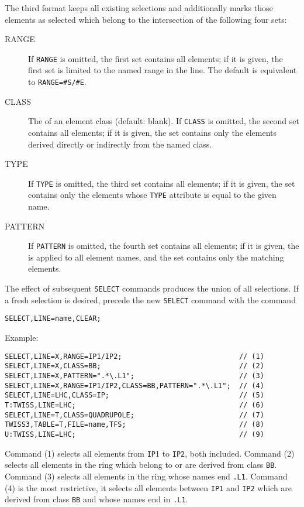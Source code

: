 The third format keeps all existing selections and additionally marks those
elements as selected which belong to the intersection of the following four
sets: 
\begin{description}
\item[RANGE]
  If \texttt{RANGE} is omitted, the first set contains all elements;
  if it is given, the first set is limited to the named range in the line. 
  The default is equivalent to \texttt{RANGE=\#S/\#E}.
\item[CLASS]
  The  of an element class (default: blank).
  If \texttt{CLASS} is omitted, the second set contains all elements;
  if it is given, the set contains only the elements derived directly or
  indirectly from the named class.
\item[TYPE]
  If \texttt{TYPE} is omitted, the third set contains all elements;
  if it is given, the set contains only the elements whose \texttt{TYPE}
  attribute is equal to the given name. 
\item[PATTERN]
  If \texttt{PATTERN} is omitted, the fourth set contains all elements;
  if it is given, the 
  is applied to all element names, and the set contains only the matching
  elements.
\end{description}
The effect of subsequent \texttt{SELECT} commands produces the union of all
selections. 
If a fresh selection is desired, precede the new \texttt{SELECT} command
with the command
\begin{verbatim}
SELECT,LINE=name,CLEAR;
\end{verbatim}
Example:
\begin{verbatim}
SELECT,LINE=X,RANGE=IP1/IP2;                            // (1)
SELECT,LINE=X,CLASS=BB;                                 // (2)
SELECT,LINE=X,PATTERN=".*\.L1";                         // (3)
SELECT,LINE=X,RANGE=IP1/IP2,CLASS=BB,PATTERN=".*\.L1";  // (4)
SELECT,LINE=LHC,CLASS=IP;                               // (5)
T:TWISS,LINE=LHC;                                       // (6)
SELECT,LINE=T,CLASS=QUADRUPOLE;                         // (7)
TWISS3,TABLE=T,FILE=name,TFS;                           // (8)
U:TWISS,LINE=LHC;                                       // (9)
\end{verbatim}
Command (1) selects all elements from \texttt{IP}1 to \texttt{IP2}, 
both included.
Command (2) selects all elements in the ring which belong to or are 
derived from class \texttt{BB}.
Command (3) selects all elements in the ring whose names end \texttt{.L1}.
Command (4) is the most restrictive, it selects all elements
between \texttt{IP1} and \texttt{IP2} which are derived from class 
\texttt{BB} and whose names end in \texttt{.L1}.

